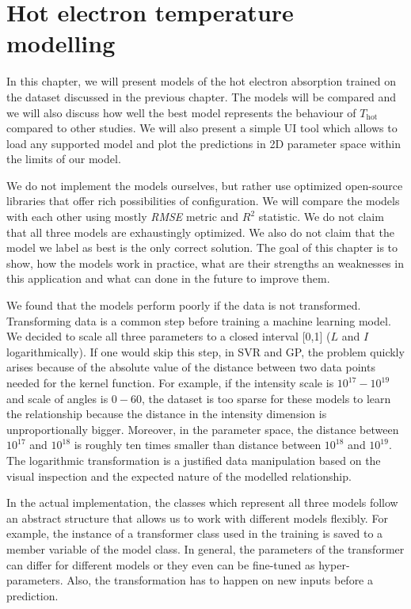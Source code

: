 \chapter{Hot electron temperature modelling}
\label{ch:models-impl}

In this chapter, we will present models of the hot electron absorption trained on the dataset discussed in the previous chapter. The models will be compared and we will also discuss how well the best model represents the behaviour of $T_{\mathrm{hot}}$ compared to other studies. We will also present a simple UI tool which allows to load any supported model and plot the predictions in 2D parameter space within the limits of our model.

We do not implement the models ourselves, but rather use optimized open-source libraries that offer rich possibilities of configuration. We will compare the models with each other using mostly \textit{RMSE} metric and $R^2$ statistic. We do not claim that all three models are exhaustingly optimized. We also do not claim that the model we label as best is the only correct solution. The goal of this chapter is to show, how the models work in practice, what are their strengths an weaknesses in this application and what can done in the future to improve them.

We found that the models perform poorly if the data is not transformed. Transforming data is a common step before training a machine learning model. We decided to scale all three parameters to a closed interval [0,1] ($L$ and $I$ logarithmically). If one would skip this step, in SVR and GP, the problem quickly arises because of the absolute value of the distance between two data points needed for the kernel function. For example, if the intensity scale is $10^{17} - 10^{19}$ and scale of angles is $0-60$, the dataset is too sparse for these models to learn the relationship because the distance in the intensity dimension is unproportionally bigger. Moreover, in the parameter space, the distance between $10^{17}$ and $10^{18}$ is roughly ten times smaller than distance between $10^{18}$ and $10^{19}$. The logarithmic transformation is a justified data manipulation based on the visual inspection and the expected nature of the modelled relationship.

In the actual implementation, the classes which represent all three models follow an abstract structure that allows us to work with different models flexibly. For example, the instance of a transformer class used in the training is saved to a member variable of the model class. In general, the parameters of the transformer can differ for different models or they even can be fine-tuned as hyper-parameters. Also, the transformation has to happen on new inputs before a prediction.

